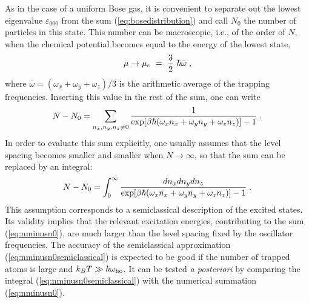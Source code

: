 As in the case of a uniform Bose gas, it is convenient to separate
out the lowest eigenvalue $\varepsilon_{000}$ from the sum
(\ref{eq:bosedistribution}) and call $N_0$ the number of particles
in this state. This number can be macroscopic, i.e., of the order
of $N$, when the chemical potential becomes equal to the energy
of the lowest state,
\begin{equation}
\mu \to \mu_c \ = \
{3 \over 2 } \ \hbar \bar{\omega}  \; ,
\label{eq:mucritical}
\end{equation}
where $\bar{\omega} = (\omega_x+\omega_y+\omega_z)/3$ is
the arithmetic average of the trapping frequencies.
Inserting this value in the rest of the sum, one can write
\begin{equation}
N-N_0 = \sum_{n_x,n_y,n_z \neq 0} { 1 \over \exp [ \beta
\hbar (\omega_x n_x  + \omega_y n_y + \omega_z n_z)] -1 } \; .
\label{eq:nminusn0}
\end{equation}
In order to evaluate this sum explicitly, one usually assumes
that the level spacing becomes smaller and smaller when $N \to
\infty$, so that the sum can be replaced by an integral:
\begin{equation}
N-N_0 = \int_0^{\infty} { dn_x dn_y dn_z \over
\exp [ \beta  \hbar (\omega_x n_x  + \omega_y n_y + \omega_z n_z)]
-1 } \; .
\label{eq:nminusn0semiclassical}
\end{equation}
This assumption corresponds to a semiclassical description
of the excited states. Its validity implies that the relevant
excitation energies, contributing to the sum (\ref{eq:nminusn0}),
are much larger than the level spacing fixed by the
oscillator frequencies. The accuracy of the semiclassical
approximation (\ref{eq:nminusn0semiclassical}) is expected to be
good  if the number of trapped atoms is large and $k_BT \gg \hbar
\omega_{\rm ho}$. It can be tested {\it a  posteriori}  by
comparing the integral (\ref{eq:nminusn0semiclassical})
with the numerical summation (\ref{eq:nminusn0}).

